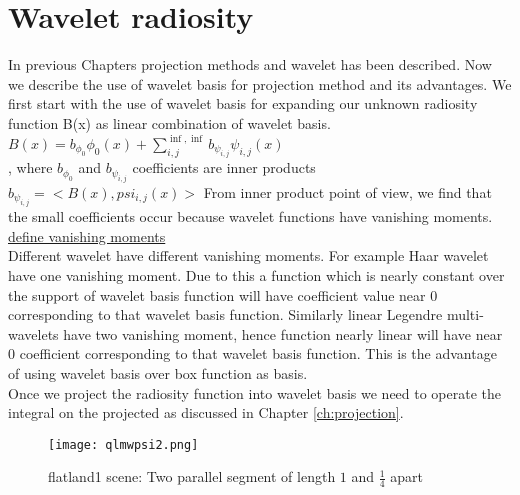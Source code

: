 \chapter{\label{ch:waveletprojection}Wavelet radiosity}
In previous Chapters projection methods and wavelet has been described. Now we describe the use of wavelet basis for projection method and its advantages. 
We first start with the use of wavelet basis for expanding our unknown radiosity function B(x) as linear combination of wavelet basis.\\

$B(x) = b_{\phi_0}\phi_0(x)+\sum_{i,j}^{\inf,\inf}b_{\psi_{i,j}}\psi_{i,j}(x)$\\,
where $b_{\phi_0}$ and $b_{\psi_{i,j}}$ coefficients are inner products\\
$b_{\psi_{i,j}}=<B(x),psi_{i,j}(x)>$
From inner product point of view, we find that the small coefficients occur because wavelet functions have vanishing moments.
\underline{ define vanishing moments}\\

Different wavelet have different vanishing moments. For example Haar wavelet have one vanishing moment. Due to this a function which is nearly constant over the support of wavelet basis function will have coefficient value near 0 corresponding to that wavelet basis function. Similarly linear Legendre multi-wavelets have two vanishing moment, hence function nearly linear will have near 0 coefficient corresponding to that wavelet basis function. This is the advantage of using wavelet basis over box function as basis.\\

Once we project the radiosity function into wavelet basis we need to operate the integral on the projected as discussed in Chapter \ref{ch:projection}.
\begin{figure}[tbh]
\centering{}
\captionsetup{justification=centering}
\texttt{[image: qlmwpsi2.png]}
\caption{\label{fig:f1scene}flatland1 scene: Two parallel segment of length $1$ and $\frac{1}{4}$ apart }
\end{figure}

